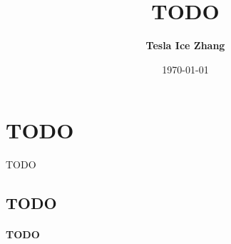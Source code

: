 \documentclass{article}
\begin{document}
  \title{TODO}
  \author{\textbf{Tesla Ice Zhang}}
  \date{\today}
  \maketitle
  \tableofcontents
  \section{TODO}
    TODO
  \subsection{TODO}
  \paragraph{TODO}
\end{document}
